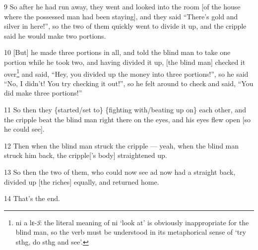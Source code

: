 9 So after he had run away, they went and looked into the room [of the house where
the possessed man had been staying], and they said ``There's gold and silver in
here!'', so the two of them quickly went to divide it up, and the cripple said
he would make two portions.

10 [But] he made three portions in all, and told the blind man to take one portion
while he took two, and having divided it up, [the blind man] checked it over\footnote{ni a lɛ-ɔ̄: the literal meaning of ni `look at' is obviously inappropriate for the blind man, so the verb must be understood in its metaphorical sense of `try sthg, do sthg and see'.}
and said, ``Hey, you divided up the money into three portions!'', so he said ``No,
I didn't! You try checking it out!'', so he felt around to check and said, ``You
did make three portions!''

11 So then they \{started/set to\} \{fighting with/beating up on\} each other,
and the cripple beat the blind man right there on the eyes, and his eyes flew open
[so he could see].

12 Then when the blind man struck the cripple --- yeah, when the blind man struck
him back, the cripple['s body] straightened up.

13 So then the two of them, who could now see ad now had a straight back, divided
up [the riches] equally, and returned home.

14 That's the end.

